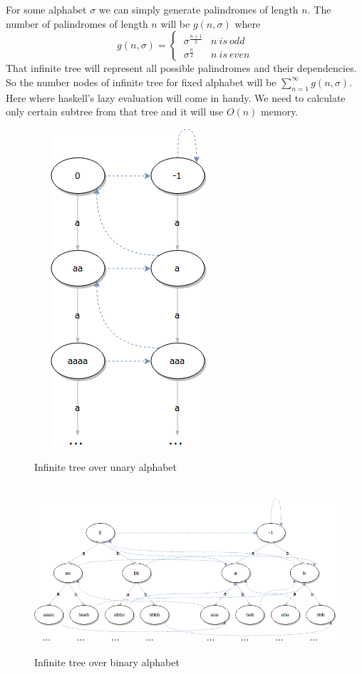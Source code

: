 For some alphabet $\sigma$ we can simply generate palindromes of length $n$. The number of palindromes of length $n$ will be $g(n, \sigma)$ where 
$$g(n, \sigma) = \begin{cases}
\ \sigma^{\frac{n+1}{2}}  & n \ is \ odd\\
\ \sigma^{\frac{n}{2}}   & n \ is \ even
\end{cases}$$
 That infinite tree will represent all possible palindromes and their dependencies. So the number nodes of infinite tree for fixed alphabet will be $\sum_{n=1}^{\infty} g(n, \sigma)$. Here where haskell's lazy evaluation will come in handy. We need to calculate only certain subtree from that tree and it will use $O(n)$ memory. 
\begin{figure}[H]
  \centering
     \includegraphics[width=0.4\linewidth]{unary.png}
 \caption{Infinite tree over unary alphabet}
\end{figure}
\begin{figure}[H]
  \centering
     \includegraphics[width=\linewidth]{binary.png}
 \caption{Infinite tree over binary alphabet}
\end{figure}
